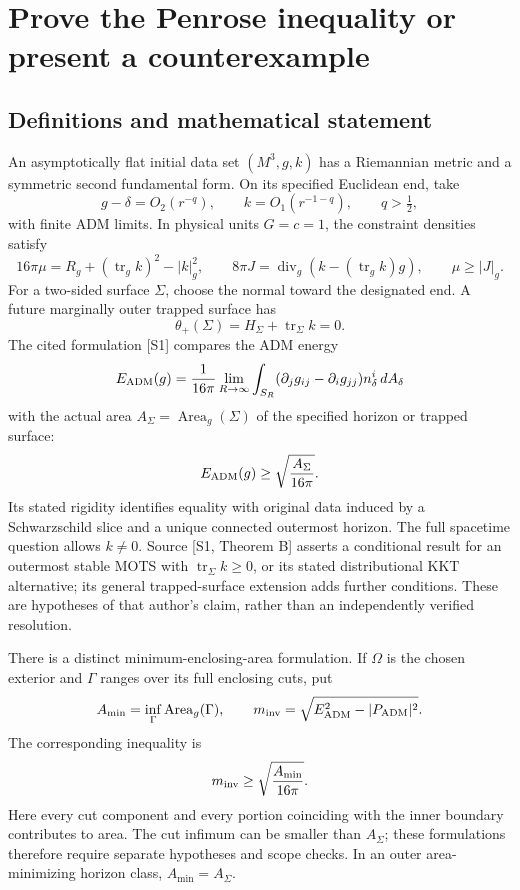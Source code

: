 \documentclass[11pt]{article}
\begin{document}
\section*{\texorpdfstring{Prove the Penrose inequality or present a counterexample}{Prove the Penrose inequality or present a counterexample}}\label{statement}
\subsection{Definitions and mathematical statement}
An asymptotically flat initial data set \((M^3,g,k)\) has a Riemannian metric and a symmetric second fundamental form. On its specified Euclidean end, take
\[
g-\delta=O_2(r^{-q}),\qquad k=O_1(r^{-1-q}),\qquad q>\tfrac12,
\]
with finite ADM limits. In physical units \(G=c=1\), the constraint densities satisfy
\[
16\pi\mu=R_g+(\operatorname{tr}_gk)^2-|k|_g^2,
\qquad8\pi J=\operatorname{div}_g(k-(\operatorname{tr}_gk)g),
\qquad\mu\ge|J|_g.
\]
For a two-sided surface \(\Sigma\), choose the normal toward the designated end. A future marginally outer trapped surface has
\[
\theta_+(\Sigma)=H_\Sigma+\operatorname{tr}_\Sigma k=0.
\]
The cited formulation [S1] compares the ADM energy
\[
E_{\rm ADM}(g)=\frac{1}{16\pi}\lim_{R\to\infty}\int_{S_R}
(\partial_jg_{ij}-\partial_i g_{jj})n_\delta^i\,dA_\delta
\]
with the actual area \(A_\Sigma=\operatorname{Area}_g(\Sigma)\) of the specified horizon or trapped surface:
\[
E_{\rm ADM}(g)\ge\sqrt{\frac{A_\Sigma}{16\pi}}.
\]
Its stated rigidity identifies equality with original data induced by a Schwarzschild slice and a unique connected outermost horizon. The full spacetime question allows \(k\ne0\). Source [S1, Theorem B] asserts a conditional result for an outermost stable MOTS with \(\operatorname{tr}_\Sigma k\ge0\), or its stated distributional KKT alternative; its general trapped-surface extension adds further conditions. These are hypotheses of that author's claim, rather than an independently verified resolution.

There is a distinct minimum-enclosing-area formulation. If \(\Omega\) is the chosen exterior and \(\Gamma\) ranges over its full enclosing cuts, put
\[
A_{\min}=\inf_\Gamma\operatorname{Area}_g(\Gamma),\qquad
m_{\rm inv}=\sqrt{E_{\rm ADM}^2-|P_{\rm ADM}|^2}.
\]
The corresponding inequality is
\[
m_{\rm inv}\ge\sqrt{\frac{A_{\min}}{16\pi}}.
\]
Here every cut component and every portion coinciding with the inner boundary contributes to area. The cut infimum can be smaller than \(A_\Sigma\); these formulations therefore require separate hypotheses and scope checks. In an outer area-minimizing horizon class, \(A_{\min}=A_\Sigma\).
\end{document}
